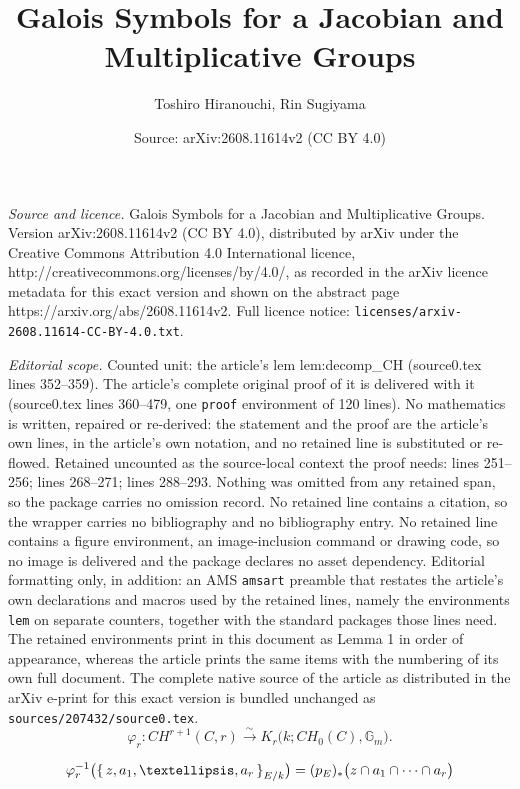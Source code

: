 \documentclass[10pt,a4paper]{amsart}
\title{Galois Symbols for a Jacobian and Multiplicative Groups}
\author{Toshiro Hiranouchi, Rin Sugiyama}
\date{Source: arXiv:2608.11614v2 (CC BY 4.0)}
\newcommand{\Gm}{\mathbb{G}_{m}}
\begin{document}
\maketitle

\noindent\emph{Source and licence.} Galois Symbols for a Jacobian and Multiplicative Groups. Version arXiv:2608.11614v2 (CC BY 4.0), distributed by arXiv under the Creative Commons Attribution 4.0 International licence, http://creativecommons.org/licenses/by/4.0/, as recorded in the arXiv licence metadata for this exact version and shown on the abstract page https://arxiv.org/abs/2608.11614v2. Full licence notice: \texttt{licenses/arxiv-2608.11614-CC-BY-4.0.txt}.\par\smallskip

\noindent\textit{Editorial scope.} Counted unit: the article's lem lem:decomp\_CH (source0.tex lines 352--359). The article's complete original proof of it is delivered with it (source0.tex lines 360--479, one \texttt{proof} environment of 120 lines). No mathematics is written, repaired or re-derived: the statement and the proof are the article's own lines, in the article's own notation, and no retained line is substituted or re-flowed.  Retained uncounted as the source-local context the proof needs: lines 251--256; lines 268--271; lines 288--293.  Nothing was omitted from any retained span, so the package carries no omission record.  No retained line contains a citation, so the wrapper carries no bibliography and no bibliography entry.  No retained line contains a figure environment, an image-inclusion command or drawing code, so no image is delivered and the package declares no asset dependency.  Editorial formatting only, in addition: an AMS \texttt{amsart} preamble that restates the article's own declarations and macros used by the retained lines, namely the environments \texttt{lem} on separate counters, together with the standard packages those lines need.  The retained environments print in this document as Lemma 1 in order of appearance, whereas the article prints the same items with the numbering of its own full document.  The complete native source of the article as distributed in the arXiv e-print for this exact version is bundled unchanged as \texttt{sources/207432/source0.tex}.
\begin{equation}\label{eq:Akh}
 \varphi_r\colon
 CH^{r+1}(C,r)
 \overset{\sim}{\to}
 K_r\bigl(k;CH_0(C),\Gm\bigr).
\end{equation}

\begin{equation}\label{eq:Akh-sym}
 \varphi_r^{-1}\bigl(\set{z,a_1,\ldots,a_r}_{E/k}\bigr)
 = (p_E)_*\bigl(z\cap a_1\cap\cdots\cap a_r\bigr)
\end{equation}
\end{document}
